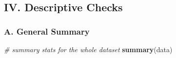 \documentclass[
]{article}
\newenvironment{Shaded}{\begin{snugshade}}{\end{snugshade}}
\newcommand{\CommentTok}[1]{\textcolor[rgb]{0.56,0.35,0.01}{\textit{#1}}}
\newcommand{\FunctionTok}[1]{\textcolor[rgb]{0.13,0.29,0.53}{\textbf{#1}}}
\newcommand{\NormalTok}[1]{#1}
\begin{document}
\subsection{IV. Descriptive Checks}\label{iv.-descriptive-checks}

\subsubsection{A. General Summary}\label{a.-general-summary}

\begin{Shaded}
\begin{Highlighting}[]
\CommentTok{\# summary stats for the whole dataset }
\FunctionTok{summary}\NormalTok{(data)}
\end{Highlighting}
\end{Shaded}
\end{document}
